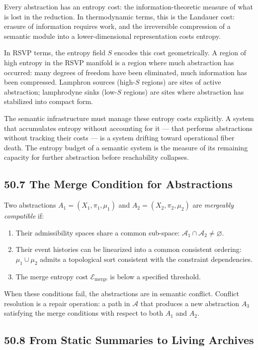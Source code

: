 \documentclass[12pt,letterpaper]{article}
\theoremstyle{remark}
\begin{document}
Every abstraction has an entropy cost: the information-theoretic
measure of what is lost in the reduction. In thermodynamic terms,
this is the Landauer cost: erasure of information requires work, and
the irreversible compression of a semantic module into a
lower-dimensional representation costs entropy.

In RSVP terms, the entropy field $S$ encodes this cost
geometrically. A region of high entropy in the RSVP manifold is a
region where much abstraction has occurred: many degrees of freedom
have been eliminated, much information has been compressed. Lamphron
sources (high-$S$ regions) are sites of active abstraction;
lamphrodyne sinks (low-$S$ regions) are sites where abstraction has
stabilized into compact form.

The semantic infrastructure must manage these entropy costs
explicitly. A system that accumulates entropy without accounting
for it — that performs abstractions without tracking their costs —
is a system drifting toward operational fiber death. The entropy
budget of a semantic system is the measure of its remaining
capacity for further abstraction before reachability collapses.

\subsection{50.7 The Merge Condition for Abstractions}

Two abstractions $A_1 = (X_1, \pi_1, \mu_1)$ and $A_2 = (X_2,
\pi_2, \mu_2)$ are \emph{mergeably compatible} if:
\begin{enumerate}
\item Their admissibility spaces share a common sub-space:
  $\mathcal{A}_1 \cap \mathcal{A}_2 \neq \varnothing$.
\item Their event histories can be linearized into a common
  consistent ordering: $\mu_1 \cup \mu_2$ admits a topological
  sort consistent with the constraint dependencies.
\item The merge entropy cost $\mathcal{E}_{\mathrm{merge}}$ is
  below a specified threshold.
\end{enumerate}

When these conditions fail, the abstractions are in semantic
conflict. Conflict resolution is a repair operation: a path in
$\mathcal{A}$ that produces a new abstraction $A_3$ satisfying the
merge conditions with respect to both $A_1$ and $A_2$.

\subsection{50.8 From Static Summaries to Living Archives}
\end{document}
